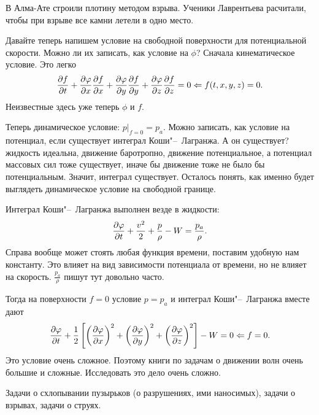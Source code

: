 В Алма-Ате строили плотину методом взрыва. Ученики Лаврентьева расчитали, чтобы при взрыве все камни летели в одно место.

Давайте теперь напишем условие на свободной поверхности для потенциальной скорости. Можно ли их записать, как условие на $\phi$? Сначала кинематическое условие. Это легко
\[
  \frac{\partial f}{\partial t} + \frac{\partial \varphi}{\partial x}\frac{\partial f}{\partial x}+\frac{\partial \varphi}{\partial y}\frac{\partial f}{\partial y}+\frac{\partial \varphi}{\partial z}\frac{\partial f}{\partial z} = 0 \Leftarrow f(t,x,y,z)=0.
\]
Неизвестные здесь уже теперь $\phi$ и $f$.

Теперь динамическое условие: $p\big|_{f=0} = p_a$. Можно записать, как условие на потенциал, если существует интеграл Коши"--~Лагранжа. А он существует? жидкость идеальна, движение баротропно, движение потенциальное, а потенциал массовых сил тоже существует, иначе бы движение тоже не было  бы потенциальным. Значит, интеграл существует. Осталось понять, как именно будет выглядеть динамическое условие на свободной границе.

Интеграл Коши"--~Лагранжа выполнен везде в жидкости:
\[
  \frac{\partial \varphi}{\partial t} +\frac{v^2}2 + \frac p\rho-W= \frac{p_a}{\rho}.
\]
Справа вообще может стоять любая функция времени, поставим удобную нам константу. Это влияет на вид зависимости потенциала от времени, но не влияет на скорость. $\frac{p_a}{\rho}$ пишут тут довольно часто.

Тогда на поверхности $f=0$ условие $p=p_a$ и интеграл Коши"--~Лагранжа вместе дают
\[
  \frac{\partial \varphi}{\partial t} + \frac12 \left[\left(\frac{\partial \varphi}{\partial x}\right)^2+\left(\frac{\partial \varphi}{\partial y}\right)^2+\left(\frac{\partial \varphi}{\partial z}\right)^2\right] - W = 0\Leftarrow f=0.
\]
Это условие очень сложное. Поэтому книги по задачам о движении волн очень большие и сложные. Исследовать это дело очень сложно.

Задачи о схлопывании пузырьков (о разрушениях, ими наносимых), задачи о взрывах, задачи о струях.
